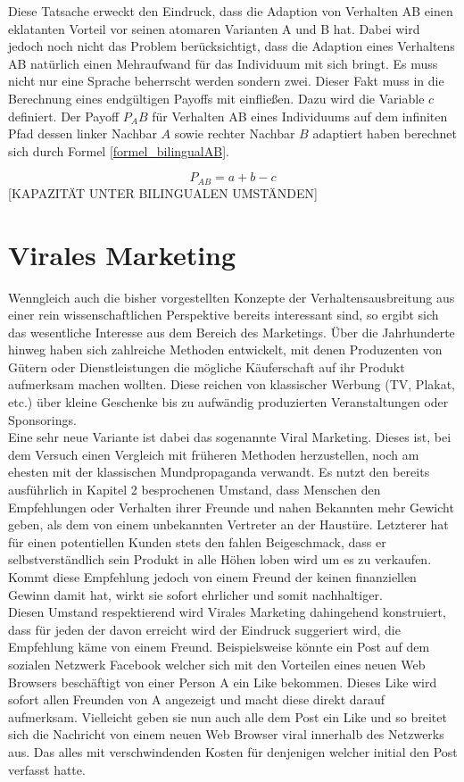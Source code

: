 \documentclass[12pt]{article}
\begin{document}
Diese Tatsache erweckt den Eindruck, dass die Adaption von Verhalten AB einen eklatanten Vorteil vor seinen atomaren Varianten A und B hat. Dabei wird jedoch noch nicht das Problem berücksichtigt, dass die Adaption eines Verhaltens AB natürlich einen Mehraufwand für das Individuum mit sich bringt. Es muss nicht nur eine Sprache beherrscht werden sondern zwei. Dieser Fakt muss in die Berechnung eines endgültigen Payoffs mit einfließen. Dazu wird die Variable $c$ definiert. Der Payoff $P_AB$ für Verhalten AB eines Individuums auf dem infiniten Pfad dessen linker Nachbar $A$ sowie rechter Nachbar $B$ adaptiert haben berechnet sich durch Formel \ref{formel_bilingualAB}.

%
  \begin{equation}
 \label{formel_bilingualAB}
 P_{AB} = a + b - c
 \end{equation}
[KAPAZITÄT UNTER BILINGUALEN UMSTÄNDEN]
\section{Virales Marketing}
Wenngleich auch die bisher vorgestellten Konzepte der Verhaltensausbreitung aus einer rein wissenschaftlichen Perspektive bereits interessant sind, so ergibt sich das wesentliche Interesse aus dem Bereich des Marketings. Über die Jahrhunderte hinweg haben sich zahlreiche Methoden entwickelt, mit denen Produzenten von Gütern oder Dienstleistungen die mögliche Käuferschaft auf ihr Produkt aufmerksam machen wollten. Diese reichen von klassischer Werbung (TV, Plakat, etc.) über kleine Geschenke bis zu aufwändig produzierten Veranstaltungen oder Sponsorings.\\ Eine sehr neue Variante ist dabei das sogenannte Viral Marketing. Dieses ist, bei dem Versuch einen Vergleich mit früheren Methoden herzustellen, noch am ehesten mit der klassischen Mundpropaganda verwandt. Es nutzt den bereits ausführlich in Kapitel 2 besprochenen Umstand, dass Menschen den Empfehlungen oder Verhalten ihrer Freunde und nahen Bekannten mehr Gewicht geben, als dem von einem unbekannten Vertreter an der Haustüre. Letzterer hat für einen potentiellen Kunden stets den fahlen Beigeschmack, dass er selbstverständlich sein Produkt in alle Höhen loben wird um es zu verkaufen. Kommt diese Empfehlung jedoch von einem Freund der keinen finanziellen Gewinn damit hat, wirkt sie sofort ehrlicher und somit nachhaltiger.\\
Diesen Umstand respektierend wird Virales Marketing dahingehend konstruiert, dass für jeden der davon erreicht wird der Eindruck suggeriert wird, die Empfehlung käme von einem Freund. Beispielsweise könnte ein Post auf dem sozialen Netzwerk Facebook welcher sich mit den Vorteilen eines neuen Web Browsers beschäftigt von einer Person A ein Like bekommen. Dieses Like wird sofort allen Freunden von A angezeigt und macht diese direkt darauf aufmerksam. Vielleicht geben sie nun auch alle dem Post ein Like und so breitet sich die Nachricht von einem neuen Web Browser viral innerhalb des Netzwerks aus. Das alles mit verschwindenden Kosten für denjenigen welcher initial den Post verfasst hatte.
\end{document}
